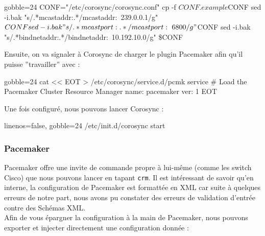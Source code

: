 \documentclass[11pt,a4paper]{report}
\begin{document}
                    \begin{bashcode*}{gobble=24}
                        CONF="/etc/corosync/corosync.conf"
                        cp -f $CONF.example $CONF
                        sed -i.bak "s/.*mcastaddr:.*/mcastaddr:\ 239.0.0.1/g" $CONF
                        sed -i.bak "s/.*mcastport:.*/mcastport:\ 6800/g" $CONF
                        sed -i.bak "s/.*bindnetaddr:.*/bindnetaddr:\ 10.192.10.0/g" \$CONF
                    \end{bashcode*}

                    Ensuite, on va signaler à Corosync de charger le plugin Pacemaker afin qu'il puisse ''travailler'' avec :\\

                    \begin{bashcode*}{gobble=24}
                        cat << EOT > /etc/corosync/service.d/pcmk
                        service {
                                # Load the Pacemaker Cluster Resource Manager
                                name: pacemaker
                                ver:  1
                        }
                        EOT
                    \end{bashcode*}

                    Une fois configuré, nous pouvons lancer Corosync :\\

                    \begin{bashcode*}{linenos=false, gobble=24}
                        /etc/init.d/corosync start
                    \end{bashcode*}
                
                \subsubsection{Pacemaker}
                
                    Pacemaker offre une invite de commande propre à lui-même (comme les switch Cisco) que nous pouvons lancer en tapant \verb+crm+. Il est intéressant de savoir qu'en interne, la configuration de Pacemaker est formattée en XML car suite à quelques erreurs de notre part, nous avons pu constater des erreurs de validation d'entrée contre des Schémas XML.\\
                    
                    Afin de vous épargner la configuration à la main de Pacemaker, nous pouvons exporter et injecter directement une configuration donnée :\\
                    
\end{document}
